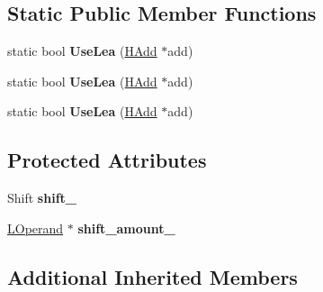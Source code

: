 \subsection*{Static Public Member Functions}
\begin{DoxyCompactItemize}
\item 
static bool {\bfseries Use\+Lea} (\hyperlink{classv8_1_1internal_1_1_h_add}{H\+Add} $\ast$add)\hypertarget{classv8_1_1internal_1_1_l_add_i_af6ce618ec6bca5b8afbcc5d4b7eeddab}{}\label{classv8_1_1internal_1_1_l_add_i_af6ce618ec6bca5b8afbcc5d4b7eeddab}

\item 
static bool {\bfseries Use\+Lea} (\hyperlink{classv8_1_1internal_1_1_h_add}{H\+Add} $\ast$add)\hypertarget{classv8_1_1internal_1_1_l_add_i_af6ce618ec6bca5b8afbcc5d4b7eeddab}{}\label{classv8_1_1internal_1_1_l_add_i_af6ce618ec6bca5b8afbcc5d4b7eeddab}

\item 
static bool {\bfseries Use\+Lea} (\hyperlink{classv8_1_1internal_1_1_h_add}{H\+Add} $\ast$add)\hypertarget{classv8_1_1internal_1_1_l_add_i_af6ce618ec6bca5b8afbcc5d4b7eeddab}{}\label{classv8_1_1internal_1_1_l_add_i_af6ce618ec6bca5b8afbcc5d4b7eeddab}

\end{DoxyCompactItemize}
\subsection*{Protected Attributes}
\begin{DoxyCompactItemize}
\item 
Shift {\bfseries shift\+\_\+}\hypertarget{classv8_1_1internal_1_1_l_add_i_a06e5151045673293fb9077ab9fa95a4a}{}\label{classv8_1_1internal_1_1_l_add_i_a06e5151045673293fb9077ab9fa95a4a}

\item 
\hyperlink{classv8_1_1internal_1_1_l_operand}{L\+Operand} $\ast$ {\bfseries shift\+\_\+amount\+\_\+}\hypertarget{classv8_1_1internal_1_1_l_add_i_ad2c5af61e53103ce7ffbdfbbe9cb028d}{}\label{classv8_1_1internal_1_1_l_add_i_ad2c5af61e53103ce7ffbdfbbe9cb028d}

\end{DoxyCompactItemize}
\subsection*{Additional Inherited Members}


